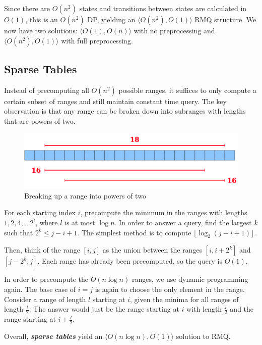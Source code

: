 \documentclass[11pt, oneside]{article}
\newcommand{\emphasis}[1]{\textbf{\textit{#1}}}
\begin{document}
Since there are \( O(n^2) \) states and transitions between states are calculated in \( O(1) \),
this is an \( O(n^2) \) DP, yielding an \( \langle O(n^2), O(1) \rangle \) RMQ structure. We now have two solutions:
\( \langle O(1), O(n) \rangle \) with no preprocessing and \( \langle O(n^2), O(1) \rangle \) with full preprocessing.

\subsection{Sparse Tables}

Instead of precomputing all \( O(n^2) \) possible ranges, it suffices to only compute a certain subset of ranges
and still maintain constant time query. The key observation is that any range can be broken down into subranges
with lengths that are powers of two.

\begin{figure}[h!]
\centering
\includegraphics[scale=0.25]{sparse_decomp}
\caption{Breaking up a range into powers of two}
\end{figure}

For each starting index \( i \), precompute the minimum in the ranges with lengths
\( 1, 2, 4, \dots 2^l \), where \( l \) is at most \( \log n \). In order to answer a query,
find the largest \( k \) such that \( 2^k \leq j - i + 1 \).
The simplest method is to compute \( \lfloor \log_2{(j - i + 1)} \rfloor \).

Then, think of the range \( [i, j] \) as the union between the ranges \( [i, i + 2^k] \) and \( [j - 2^k, j] \).
Each range has already been precomputed, so the query is \( O(1) \).

In order to precompute the \( O(n \log n) \) ranges, we use dynamic programming again.
The base case of \( i = j \) is again to choose the only element in the range. Consider a range of length \( l \) starting
at \( i \), given the minima for all ranges of length \( \frac{l}{2} \). The answer would just be
the range starting at \( i \) with length \( \frac{l}{2} \) and the range starting at \( i + \frac{l}{2} \).

Overall, \emphasis{sparse tables} yield an \( \langle O(n \log n), O(1) \rangle \) solution to RMQ.
\end{document}
